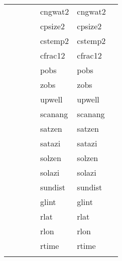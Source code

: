 \documentclass[11pt]{article}
\begin{document}
\begin{center}
\begin{tabular}{lllllll}
{{           &            &            &            &  cngwat2               &  cngwat2               &            \\
           &            &            &            &  cpsize2               &  cpsize2               &            \\
           &            &            &            &  cstemp2               &  cstemp2               &            \\
           &            &            &            &  cfrac12               &  cfrac12               &            \\
           &            &            &            &  pobs                  &  pobs                  &            \\
           &            &            &            &  zobs                  &  zobs                  &            \\
           &            &            &            &  upwell                &  upwell                &            \\
           &            &            &            &  scanang               &  scanang               &            \\
           &            &            &            &  satzen                &  satzen                &            \\
           &            &            &            &  satazi                &  satazi                &            \\
           &            &            &            &  solzen                &  solzen                &            \\
           &            &            &            &  solazi                &  solazi                &            \\
           &            &            &            &  sundist               &  sundist               &            \\
           &            &            &            &  glint                 &  glint                 &            \\
           &            &            &            &  rlat                  &  rlat                  &            \\
           &            &            &            &  rlon                  &  rlon                  &            \\
           &            &            &            &  rtime                 &  rtime                 &            \\
}}
\end{tabular}
\end{center}
\end{document}
